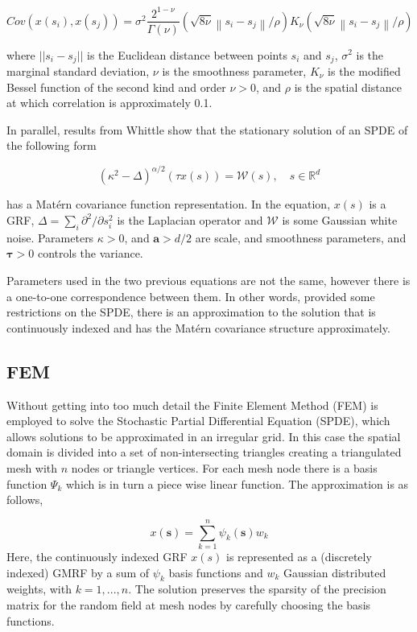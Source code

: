 \documentclass[
]{book}
\begin{document}
\[Cov\left(x(s_i), x(s_j)\right)=\sigma^2 \frac{2^{1-\nu}}{\Gamma(\nu)}\left(\sqrt{8 \nu}\left\|s_i-s_j\right\| / \rho\right) K_\nu\left(\sqrt{8 \nu}\left\|s_i-s_j\right\| / \rho\right)\]

where \(||s_i-s_j||\) is the Euclidean distance between points \(s_i\) and \(s_j\), \(\sigma^2\) is the marginal standard deviation, \(\nu\) is the smoothness parameter, \(K_{\nu}\) is the modified Bessel function of the second kind and order \(\nu>0\), and \(\rho\) is the spatial distance at which correlation is approximately 0.1.

In parallel, results from Whittle \citep{whittle_stationary_1954} show that the stationary solution of an SPDE of the following form

\[\left(\kappa^2-\Delta\right)^{\alpha / 2}(\tau x(s))=\mathcal{W}(s), \quad s \in \mathbb{R}^d\]

has a Matérn covariance function representation. In the equation, \(x(s)\) is a GRF, \(\Delta=\sum_i \partial^2 / \partial s_i^2\) is the Laplacian operator and \(\mathcal{W}\) is some Gaussian white noise. Parameters \(\kappa>0\), and \(\boldsymbol{a}>d / 2\) are scale, and smoothness parameters, and \(\boldsymbol{\tau}>0\) controls the variance.

Parameters used in the two previous equations are not the same, however there is a one-to-one correspondence between them. In other words, provided some restrictions on the SPDE, there is an approximation to the solution that is continuously indexed and has the Matérn covariance structure approximately.

\hypertarget{fem}{%
\subsection*{FEM}\label{fem}}

Without getting into too much detail the Finite Element Method (FEM) is employed to solve the Stochastic Partial Differential Equation (SPDE), which allows solutions to be approximated in an irregular grid. In this case the spatial domain is divided into a set of non-intersecting triangles creating a triangulated mesh with \(n\) nodes or triangle vertices. For each mesh node there is a basis function \(\Psi_k\) which is in turn a piece wise linear function. The approximation is as follows,

\[x(\mathbf{s})=\sum_{k=1}^n \psi_k(\mathbf{s}) w_k\]
Here, the continuously indexed GRF \(x(s)\) is represented as a (discretely indexed) GMRF by a sum of \(\psi_k\) basis functions and \(w_k\) Gaussian distributed weights, with \(k=1,...,n\). The solution preserves the sparsity of the precision matrix for the random field at mesh nodes by carefully choosing the basis functions.
\end{document}
